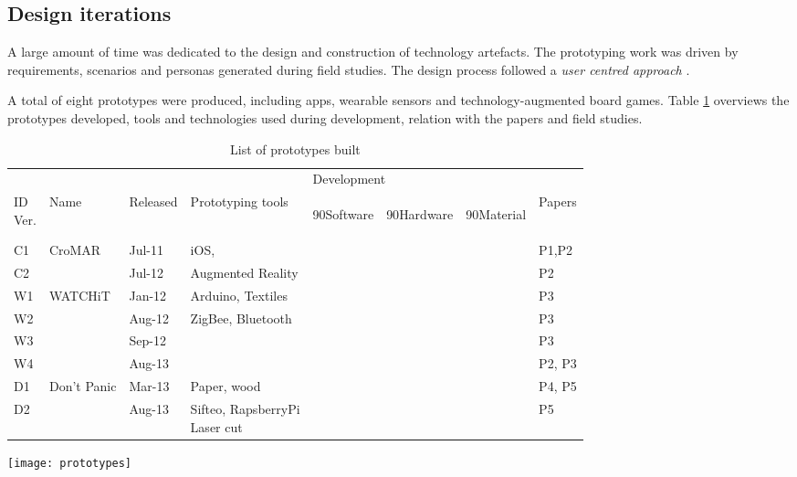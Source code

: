 \subsection{Design iterations}\label{prototypes}

A large amount of time was dedicated to the design and construction of technology artefacts. The prototyping work was driven by requirements, scenarios and personas generated during field studies. The design process followed a \emph{user centred approach} \autocites{MAGUIRE:2001dp}{Gulliksen:2003hd}.

A total of eight prototypes were produced, including apps, wearable sensors and technology-augmented board games. Table \ref{tab:prototypes} overviews the prototypes developed, tools and technologies used during development, relation with the papers and field studies.
\begin{table}
	[!p] \centering \caption{List of prototypes built} \label{tab:prototypes} 
	\begin{threeparttable}
		\begin{tabular}{@{}llllllll@{}} 
			\toprule 
			& & & & \multicolumn{3}{l}{Development}  \\
			\cline{5-7} \noalign{\smallskip} 
			\specialcell[b]{ID\\Ver.} & Name & Released & Prototyping tools & 
			\begin{turn}
				{90}Software
			\end{turn}
			& 
			\begin{turn}
				{90}Hardware
			\end{turn}
			& 
			\begin{turn}
				{90}Material
			\end{turn}
			& Papers \\
			\midrule \noalign{\smallskip} C1 & CroMAR & Jul-11 & iOS, & \textbullet & & & P1,P2 \\
			C2 & & Jul-12 & Augmented Reality & \textbullet & & & P2 \\
			\hline \noalign{\smallskip} W1 & WATCHiT & Jan-12 & Arduino, Textiles & \textbullet & \textbullet & & P3 \\
			W2 & & Aug-12 & ZigBee, Bluetooth & \textbullet & \textbullet & & P3 \\
			W3 & & Sep-12 & & \textbullet & \textbullet & & P3 \\
			W4 & & Aug-13 & & \textbullet & \textbullet & \textbullet & P2, P3 \\
			\hline \noalign{\smallskip} D1 & Don't Panic & Mar-13 & Paper, wood & & & \textbullet & P4, P5 \\
			D2 & & Aug-13 & \specialcell[t]{Sifteo, RapsberryPi\\Laser cut} & \textbullet & \textbullet & \textbullet & P5 \\
			\bottomrule 
		\end{tabular}
		\begin{tablenotes}
			\item 
			\texttt{[image: prototypes]} 
		\end{tablenotes}
	\end{threeparttable}
\end{table}

